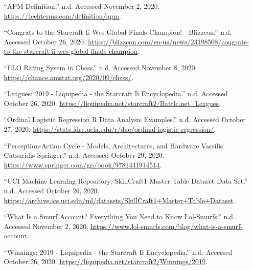 \documentclass[]{article}
\begin{document}
\leavevmode\hypertarget{ref-APM}{}%
``APM Definition.'' n.d. Accessed November 2, 2020.
\url{https://techterms.com/definition/apm}.

\leavevmode\hypertarget{ref-SC2IIWCSGlobal}{}%
``Congrats to the Starcraft Ii Wcs Global Finals Champion! - Blizzcon.''
n.d. Accessed October 26, 2020.
\url{https://blizzcon.com/en-us/news/23198508/congrats-to-the-starcraft-ii-wcs-global-finals-champion}.

\leavevmode\hypertarget{ref-ELO}{}%
``ELO Rating Sysem in Chess.'' n.d. Accessed November 8, 2020.
\url{https://chance.amstat.org/2020/09/chess/}.

\leavevmode\hypertarget{ref-Leagues2019}{}%
``Leagues: 2019 - Liquipedia - the Starcraft Ii Encyclopedia.'' n.d.
Accessed October 26, 2020.
\url{https://liquipedia.net/starcraft2/Battle.net_Leagues}.

\leavevmode\hypertarget{ref-OrdinalLog}{}%
``Ordinal Logistic Regression \textbar{} R Data Analysis Examples.''
n.d. Accessed October 27, 2020.
\url{https://stats.idre.ucla.edu/r/dae/ordinal-logistic-regression/}.

\leavevmode\hypertarget{ref-Perception}{}%
``Perception-Action Cycle - Models, Architectures, and Hardware
\textbar{} Vassilis Cutsuridis \textbar{} Springer.'' n.d. Accessed
October 29, 2020. \url{https://www.springer.com/gp/book/9781441914514}.

\leavevmode\hypertarget{ref-UCI}{}%
``UCI Machine Learning Repository: SkillCraft1 Master Table Dataset Data
Set.'' n.d. Accessed October 26, 2020.
\url{https://archive.ics.uci.edu/ml/datasets/SkillCraft1+Master+Table+Dataset}.

\leavevmode\hypertarget{ref-Smurf}{}%
``What Is a Smurf Account? Everything You Need to Know \textbar{}
Lol-Smurfs.'' n.d. Accessed November 2, 2020.
\url{https://www.lol-smurfs.com/blog/what-is-a-smurf-account}.

\leavevmode\hypertarget{ref-Winnings2019}{}%
``Winnings: 2019 - Liquipedia - the Starcraft Ii Encyclopedia.'' n.d.
Accessed October 26, 2020.
\url{https://liquipedia.net/starcraft2/Winnings/2019}.
\end{document}
